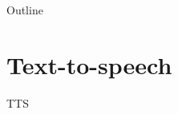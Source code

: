 
\usepackage{tikz}
\usetikzlibrary{arrows,shapes,positioning,shadows,trees}

\begin{frame}
\titlepage
\end{frame}
\begin{frame}{Outline}
	\tableofcontents
\end{frame}

\section{Text-to-speech}
\begin{frame}{TTS}
    
\end{frame}


 
